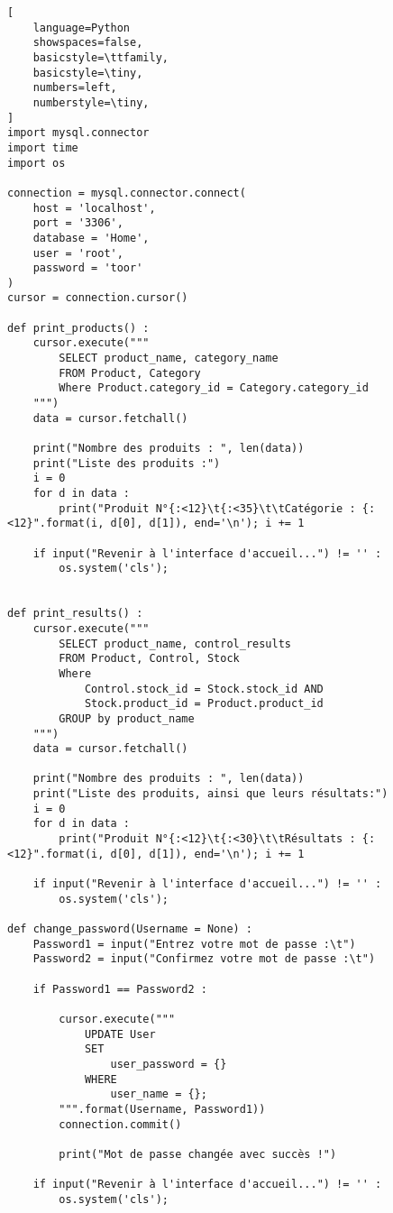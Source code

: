 \begin{lstlisting}[
    language=Python
    showspaces=false,
    basicstyle=\ttfamily,
    basicstyle=\tiny,
    numbers=left,
    numberstyle=\tiny,
]
import mysql.connector
import time
import os

connection = mysql.connector.connect(
    host = 'localhost',
    port = '3306',
    database = 'Home',
    user = 'root',
    password = 'toor'
)
cursor = connection.cursor()

def print_products() :
    cursor.execute("""
        SELECT product_name, category_name
        FROM Product, Category
        Where Product.category_id = Category.category_id
    """)
    data = cursor.fetchall()

    print("Nombre des produits : ", len(data))
    print("Liste des produits :")
    i = 0
    for d in data :
        print("Produit N°{:<12}\t{:<35}\t\tCatégorie : {:<12}".format(i, d[0], d[1]), end='\n'); i += 1

    if input("Revenir à l'interface d'accueil...") != '' :
        os.system('cls');


def print_results() :
    cursor.execute("""
        SELECT product_name, control_results
        FROM Product, Control, Stock
        Where
        	Control.stock_id = Stock.stock_id AND
            Stock.product_id = Product.product_id
        GROUP by product_name
    """)
    data = cursor.fetchall()

    print("Nombre des produits : ", len(data))
    print("Liste des produits, ainsi que leurs résultats:")
    i = 0
    for d in data :
        print("Produit N°{:<12}\t{:<30}\t\tRésultats : {:<12}".format(i, d[0], d[1]), end='\n'); i += 1

    if input("Revenir à l'interface d'accueil...") != '' :
        os.system('cls');

def change_password(Username = None) :
    Password1 = input("Entrez votre mot de passe :\t")
    Password2 = input("Confirmez votre mot de passe :\t")

    if Password1 == Password2 :

        cursor.execute("""
            UPDATE User
            SET
                user_password = {}
            WHERE
                user_name = {};
        """.format(Username, Password1))
        connection.commit()

        print("Mot de passe changée avec succès !")

    if input("Revenir à l'interface d'accueil...") != '' :
        os.system('cls');


\end{lstlisting}
